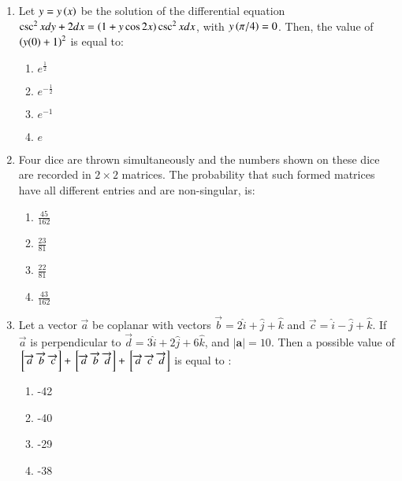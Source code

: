 \documentclass[journal]{IEEEtran}
\begin{document}
\begin{enumerate}
{\begin{multicols}{4}
\begin{enumerate}
\end{enumerate}
\end{multicols}
}
\item{
Let $y=y\left(x\right)$ be the solution of the differential equation $\csc^2x dy + 2dx = \left(1+y \cos 2x\right) \csc^2x dx$, with $y\left(\pi/4\right) = 0$. Then, the value of $\left(y(0)+1\right)^2$ is equal to:
\begin{multicols}{4}
\begin{enumerate}
\item $e^\frac{1}{2}$
\item $e^{-\frac{1}{2}}$
\item $e^{-1}$
\item $e$
\end{enumerate}
\end{multicols}
}
\item{
Four dice are thrown simultaneously and the numbers shown on these dice are recorded in $2\times 2$
matrices. The probability that such formed matrices have all different entries and are non-singular, is:
\begin{multicols}{4}
\begin{enumerate}
\item $\frac{45}{162}$
\item $\frac{23}{81}$
\item $\frac{22}{81}$
\item $\frac{43}{162}$
\end{enumerate}
\end{multicols}
}
\item{
Let a vector $\overrightarrow{a}$ be coplanar with vectors $\overrightarrow{b} = 2\hat{i} + \hat{j}  + \hat{k} $ and $\overrightarrow{c} = \hat{i}  - \hat{j}  + \hat{k} $. If $\overrightarrow{a}$ is perpendicular to $\overrightarrow{d} = 3\hat{i} + 2\hat{j} + 6\hat{k}$, and $|\textbf{a}| = 10$. Then a possible value of ${}\left[\overrightarrow{a}\text{ }\overrightarrow{b}\text{ }\overrightarrow{c}\right]+{}\left[\overrightarrow{a}\text{ }\overrightarrow{b}\text{ }\overrightarrow{d}\right]+{}\left[\overrightarrow{a}\text{ }\overrightarrow{c}\text{ }\overrightarrow{d}\right] $ is equal to :
\begin{multicols}{4}
\begin{enumerate}
\item -42
\item -40
\item -29
\item -38
\end{enumerate}
\end{multicols}
}
\end{enumerate}
\end{document}
